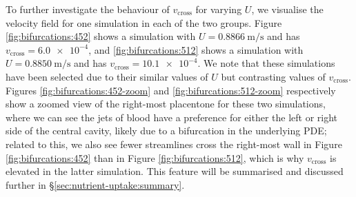             To further investigate the behaviour of $v_\text{cross}$ for varying $U$, we visualise the velocity field for one simulation in each of the two groups. Figure \ref{fig:bifurcations:452} shows a simulation with $U = \qty{0.8866}{\metre\per\second}$ and has $v_\text{cross} = \num{6.0e-4}$, and \ref{fig:bifurcations:512} shows a simulation with $U = \qty{0.8850}{\metre\per\second}$ and has $v_\text{cross} = \num{10.1e-4}$. We note that these simulations have been selected due to their similar values of $U$ but contrasting values of $v_\text{cross}$. Figures \ref{fig:bifurcations:452-zoom} and \ref{fig:bifurcations:512-zoom} respectively show a zoomed view of the right-most placentone for these two simulations, where we can see the jets of blood have a preference for either the left or right side of the central cavity, likely due to a bifurcation in the underlying PDE; related to this, we also see fewer streamlines cross the right-most wall in Figure \ref{fig:bifurcations:452} than in Figure \ref{fig:bifurcations:512}, which is why $v_\text{cross}$ is elevated in the latter simulation. This feature will be summarised and discussed further in \S\ref{sec:nutrient-uptake:summary}.

